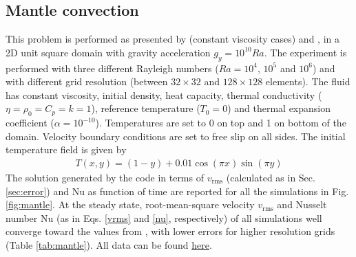 \subsection{Mantle convection}\label{sec:mantle}
This problem is performed as presented by \citet{Blankenbach1989} (constant viscosity cases) and \citet{Thieulot2014}, in a 2D unit square domain with gravity
acceleration $g_y=10^{10}Ra$. The experiment is performed with three different Rayleigh numbers ($Ra=10^4$, $10^5$ and $10^6$) and with different grid
resolution (between $32\times32$ and $128\times128$ elements). The fluid has constant viscosity, initial density, heat capacity, thermal conductivity
($\eta= \rho_0= C_p = k=1$), reference temperature ($T_0=0$) and thermal expansion coefficient ($\alpha=10^{-10}$). Temperatures are set to 0 on top and 1 on
bottom of the domain. Velocity boundary conditions are set to free slip on all sides. The initial temperature field is given by
\begin{eqnarray}
T(x,y)=(1-y)+0.01 \cos (\pi x) \sin (\pi y)\nonumber
\end{eqnarray}
The solution generated by the code in terms of $v_{\textrm{rms}}$ (calculated as in Sec. \ref{sec:error}) and Nu as function of time are reported for all the
simulations in Fig. \ref{fig:mantle}. At the steady state, root-mean-square velocity $v_{\textrm{rms}}$ and Nusselt number Nu (as in Eqs. \ref{vrms} and \ref{nu}, respectively) of all simulations well converge toward the values from \citet{Blankenbach1989},
with lower errors for higher resolution grids (Table \ref{tab:mantle}). All data can be found 
\href{https://github.com/aleregorda/Benchmarks/tree/main/Momentum%2BEnergy/Mantle_convection}{here}.

